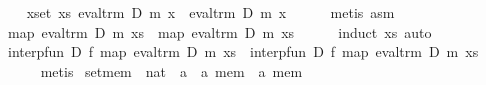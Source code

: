 \begin{isabellebody}
\ \ \isamarkupfalse%
\ {}{}x{}set\ xs{}\ eval{}trm\ D\ m{}\ x\ {}\ eval{}trm\ D\ m{}\ x{}\isanewline
\ \ \ \ \isamarkupfalse%
\ {}metis\ asm{}{}\isanewline
\ \ \isamarkupfalse%
\ {}map\ {}eval{}trm\ D\ m{}{}\ xs\ {}\ map\ {}eval{}trm\ D\ m{}{}\ xs{}\isanewline
\ \ \ \ \isamarkupfalse%
\ {}induct\ xs{}\ auto{}\isanewline
\ \ \isamarkupfalse%
\ {}interp{}fun\ D\ f\ {}map\ {}eval{}trm\ D\ m{}{}\ xs{}\ {}\ interp{}fun\ D\ f\ {}map\ {}eval{}trm\ D\ m{}{}\ xs{}{}\isanewline
\ \ \ \ \isamarkupfalse%
\ metis\isanewline
{}\isamarkupfalse%
%
\endisatagproof
{\isafoldproof}%
%
\isadelimproof
\isanewline
%
\endisadelimproof
\isanewline
{}\isamarkupfalse%
\ set{}mem\ {}{}\ {}nat\ {}\ {}a\ {}\ {}a\ mem\ {}\ {}a\ mem{}\ \isanewline

\end{isabellebody}
